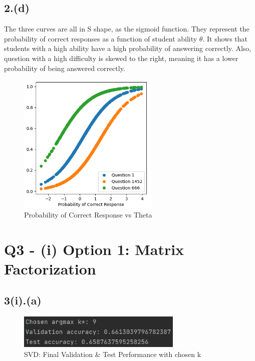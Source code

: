 \documentclass{article}
\begin{document}
\subsection*{2.(d)}
The three curves are all in S shape, as the sigmoid function. They represent the probability of correct responses as a function of student ability $\theta$.\newline
It shows that students with a high ability have a high probability of answering correctly.\newline
Also, question with a high difficulty is skewed to the right, meaning it has a lower probability of being answered correctly.
\begin{figure}[H]
    \centering
    \includegraphics[width=0.6\textwidth]{2(d).png}
    \caption{Probability of Correct Response vs Theta}
\end{figure}
\newpage


\section*{Q3 - (i) Option 1: Matrix Factorization}

\subsection*{3(i).(a)}
\begin{figure}[H]
    \centering
    \includegraphics[width=0.7\textwidth]{3(i)(a).png}
    \caption{SVD: Final Validation \& Test Performance with chosen k\*}
\end{figure}
\end{document}
